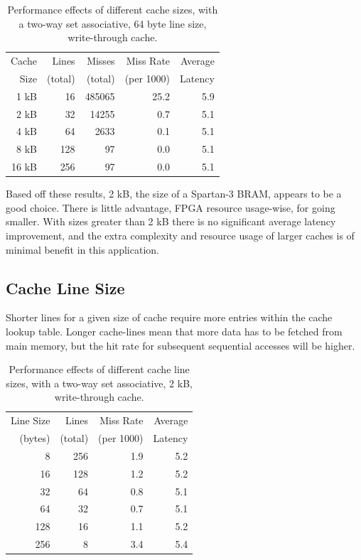 \begin{table}[h!]
\begin{center}
\begin{tabular}{ r  r  r  r  r }
Cache & Lines   & Misses  & Miss Rate  & Average \\
Size  & (total) & (total) & (per 1000) & Latency \\
\hline
1 kB  &  16 & 485065 & 25.2 & 5.9 \\
2 kB  &  32 &  14255 &  0.7 & 5.1 \\
4 kB  &  64 &   2633 &  0.1 & 5.1 \\
8 kB  & 128 &     97 &  0.0 & 5.1 \\
16 kB & 256 &     97 &  0.0 & 5.1 \\
\end{tabular}
\caption[Cache size vs. performance]{Performance effects of different cache
sizes, with a two-way set associative, 64 byte line size, write-through cache.}
\label{Mem_Cache_Size}
\end{center}
\end{table}

Based off these results, 2 kB, the size of a Spartan-3 BRAM, appears to be a good
choice. There is little advantage, FPGA resource usage-wise, for going smaller.
With sizes greater than 2 kB there is no significant average latency improvement,
and the extra complexity and resource usage of larger caches is of minimal
benefit in this application.


\subsection{Cache Line Size}
Shorter lines for a given size of cache require more entries within the cache
lookup table. Longer cache-lines mean that more data has to be fetched from main
memory, but the hit rate for subsequent sequential accesses will be higher.

\begin{table}[h!]
\begin{center}
\begin{tabular}{r r r r}
Line Size & Lines   & Miss Rate  & Average \\
 (bytes)  & (total) & (per 1000) & Latency \\
\hline
8   & 256 & 1.9  & 5.2 \\
16  & 128 & 1.2  & 5.2 \\
32  & 64  & 0.8  & 5.1 \\
64  & 32  & 0.7  & 5.1 \\
128 & 16  & 1.1  & 5.2 \\
256 & 8   & 3.4  & 5.4 \\
\end{tabular}
\caption[Cache line-size vs. performance]{Performance effects of different
cache line sizes, with a two-way set associative, 2 kB, write-through cache.}
\label{MEM_Line_Size}
\end{center}
\end{table}

